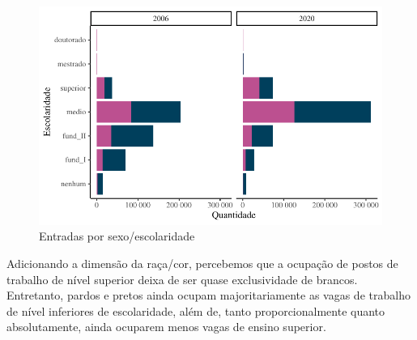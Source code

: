 \documentclass[
  12pt,
  letterpaper,
  DIV=11,
  numbers=noendperiod]{scrartcl}
\begin{document}
\begin{figure}

{\centering \includegraphics[width=1\textwidth,height=\textheight]{monografia_files/figure-pdf/entradas por escolaridade-1.pdf}

}

\caption{Entradas por sexo/escolaridade}

\end{figure}

Adicionando a dimensão da raça/cor, percebemos que a ocupação de postos
de trabalho de nível superior deixa de ser quase exclusividade de
brancos. Entretanto, pardos e pretos ainda ocupam majoritariamente as
vagas de trabalho de nível inferiores de escolaridade, além de, tanto
proporcionalmente quanto absolutamente, ainda ocuparem menos vagas de
ensino superior.
\end{document}
